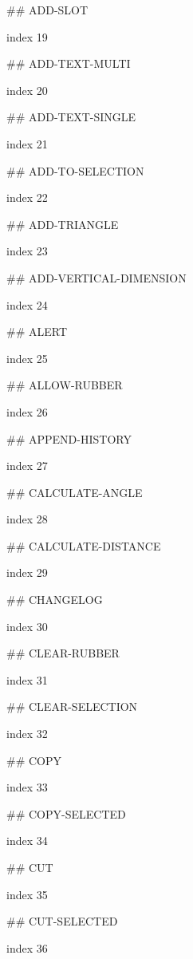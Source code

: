 ## ADD-SLOT

index 19



## ADD-TEXT-MULTI

index 20



## ADD-TEXT-SINGLE

index 21



## ADD-TO-SELECTION

index 22



## ADD-TRIANGLE

index 23



## ADD-VERTICAL-DIMENSION

index 24



## ALERT

index 25



## ALLOW-RUBBER

index 26



## APPEND-HISTORY

index 27



## CALCULATE-ANGLE

index 28



## CALCULATE-DISTANCE

index 29



## CHANGELOG

index 30



## CLEAR-RUBBER

index 31



## CLEAR-SELECTION

index 32



## COPY

index 33



## COPY-SELECTED

index 34



## CUT

index 35



## CUT-SELECTED

index 36



